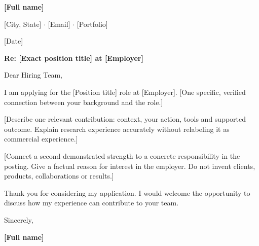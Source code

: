 \documentclass[11pt,letterpaper]{article}
\newcommand{\placeholder}[1]{\textcolor{LinkBlue}{[#1]}}
\begin{document}
{\LARGE\bfseries\color{Navy}\placeholder{Full name}}\par
\placeholder{City, State} $\cdot$ \placeholder{Email} $\cdot$ \placeholder{Portfolio}

\placeholder{Date}

\textbf{Re: \placeholder{Exact position title} at \placeholder{Employer}}

Dear Hiring Team,

I am applying for the \placeholder{Position title} role at \placeholder{Employer}.
\placeholder{One specific, verified connection between your background and the role.}

\placeholder{Describe one relevant contribution: context, your action, tools and supported outcome. Explain research experience accurately without relabeling it as commercial experience.}

\placeholder{Connect a second demonstrated strength to a concrete responsibility in the posting. Give a factual reason for interest in the employer. Do not invent clients, products, collaborations or results.}

Thank you for considering my application. I would welcome the opportunity to discuss how my experience can contribute to your team.

Sincerely,\par
\textbf{\placeholder{Full name}}
\end{document}

